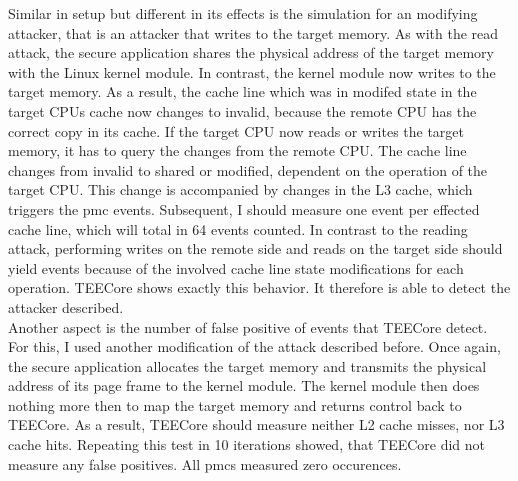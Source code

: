 Similar in setup but different in its effects is the simulation for an modifying
attacker, that is an attacker that writes to the target memory. As with the read
attack, the secure application shares the physical address of the target memory
with the Linux kernel module. In contrast, the kernel module now writes to the
target memory. As a result, the cache line which was in modifed state in the
target CPUs cache now changes to invalid, because the remote CPU has the correct
copy in its cache. If the target CPU now reads or writes the target memory, it
has to query the changes from the remote CPU. The cache line changes from
invalid to shared or modified, dependent on the operation of the target CPU.
This change is accompanied by changes in the L3 cache, which triggers the
\gls{pmc} events. Subsequent, I should measure one event per effected cache
line, which will total in 64 events counted. In contrast to the reading attack,
performing writes on the remote side and reads on the target side should yield
events because of the involved cache line state modifications for each
operation. TEECore shows exactly this behavior. It therefore is able to detect
the attacker described.\\

Another aspect is the number of false positive of events that TEECore detect.
For this, I used another modification of the attack described before. Once
again, the secure application allocates the target memory and transmits the
physical address of its page frame to the kernel module. The kernel module then
does nothing more then to map the target memory and returns control back to
TEECore. As a result, TEECore should measure neither L2 cache misses, nor L3
cache hits. Repeating this test in 10 iterations showed, that TEECore did not
measure any false positives. All \glspl{pmc} measured zero occurences.\\

